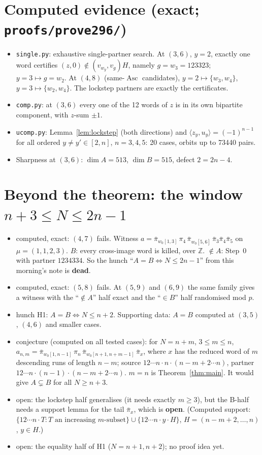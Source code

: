 \documentclass[11pt]{amsart}
\newcommand{\gr}[1]{\textsf{#1}}
\newcommand{\pb}{\bar\pi}
\newcommand{\wo}{w_0}
\newcommand{\ZZ}{\mathbb{Z}}
\newcommand{\Asc}{\operatorname{Asc}}
\theoremstyle{plain}
\theoremstyle{definition}
\begin{document}
\section{Computed evidence (exact; \texttt{proofs/prove296/})}
\begin{itemize}[leftmargin=1.2em,itemsep=1pt]
\item \texttt{single.py}: exhaustive single-partner search. At $(3,6)$, $y=2$, exactly one word certifies $(z,0)\notin(v_{w_y},v_g)H$, namely $g=w_3=123323$; $y=3\mapsto g=w_2$. At $(4,8)$ (same-$\Asc$ candidates), $y=2\mapsto\{w_3,w_4\}$, $y=3\mapsto\{w_2,w_4\}$. The lockstep partners are exactly the certificates.
\item \texttt{comp.py}: at $(3,6)$ every one of the 12 words of $z$ is in its own bipartite component, with $z$-sum $\pm1$.
\item \texttt{ucomp.py}: Lemma~\ref{lem:lockstep} (both directions) and $\langle z_y,u_y\rangle=(-1)^{n-1}$ for all ordered $y\ne y'\in[2,n]$, $n=3,4,5$: 20 cases, orbits up to 73440 pairs.
\item Sharpness at $(3,6)$: $\dim A=513$, $\dim B=515$, defect $2=2n-4$.
\end{itemize}

\section{Beyond the theorem: the window $n+3\le N\le 2n-1$}
\begin{itemize}[leftmargin=1.2em,itemsep=1pt]
\item \gr{computed, exact}: $(4,7)$ fails. Witness $a=\pb_{\wo[1,3]}\,\pi_4\,\pb_{\wo[5,6]}\,\pb_3\pb_4\pb_5$ on $\mu=(1,1,2,3)$. $B$: every cross-image word is killed, over $\ZZ$. $\notin A$: Step~0 with partner $1234334$. So the hunch ``$A=B\iff N\le2n-1$'' from this morning's note is \textbf{dead}.
\item \gr{computed, exact}: $(5,8)$ fails. At $(5,9)$ and $(6,9)$ the same family gives a witness with the ``$\notin A$'' half exact and the ``$\in B$'' half randomised mod $p$.
\item \gr{hunch} H1: $A=B\iff N\le n+2$. Supporting data: $A=B$ computed at $(3,5)$, $(4,6)$ and smaller cases.
\item \gr{conjecture} (computed on all tested cases): for $N=n+m$, $3\le m\le n$,
$a_{n,m}=\pb_{\wo[1,n-1]}\,\pi_n\,\pb_{\wo[n+1,n+m-1]}\,\pb_x$, where $x$ has the reduced word of $m$ descending runs of length $n-m$; source $12\cdots n\cdot n\cdot(n-m+2\cdots n)$, partner $12\cdots n\cdot(n-1)\cdot(n-m+2\cdots n)$. $m=n$ is Theorem~\ref{thm:main}. It would give $A\subsetneq B$ for all $N\ge n+3$.
\item \gr{open}: the lockstep half generalises (it needs exactly $m\ge3$), but the B-half needs a support lemma for the tail $\pb_x$, which is \textbf{open}. (Computed support: $\{12\cdots n\cdot T: T\text{ an increasing }m\text{-subset}\}\cup\{12\cdots n\cdot y\cdot H\}$, $H=(n-m+2,\dots,n)$, $y\in H$.)
\item \gr{open}: the equality half of H1 ($N=n+1,n+2$); no proof idea yet.
\end{itemize}
\end{document}
